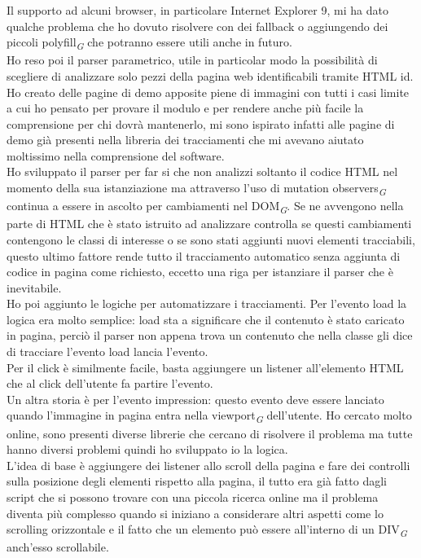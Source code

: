 \documentclass[a4paper, 12pt, twoside, openright]{book}
\newcommand{\gloss}[1]{#1\textsubscript{\textit{\tiny{G}}}}
\begin{document}
Il supporto ad alcuni browser, in particolare Internet Explorer 9, mi ha dato qualche problema che ho dovuto risolvere con dei fallback o aggiungendo dei piccoli \gloss{polyfill} che potranno essere utili anche in futuro.\\
Ho reso poi il parser parametrico, utile in particolar modo la possibilità di scegliere di analizzare solo pezzi della pagina web identificabili tramite HTML id.\\
Ho creato delle pagine di demo apposite piene di immagini con tutti i casi limite a cui ho pensato per provare il modulo e per rendere anche più facile la comprensione per chi dovrà mantenerlo, mi sono ispirato infatti alle pagine di demo già presenti nella libreria dei tracciamenti che mi avevano aiutato moltissimo nella comprensione del software.\\
Ho sviluppato il parser per far si che non analizzi soltanto il codice HTML nel momento della sua istanziazione ma attraverso l'uso di \gloss{mutation observers} continua a essere in ascolto per cambiamenti nel \gloss{DOM}. Se ne avvengono nella parte di HTML che è stato istruito ad analizzare controlla se questi cambiamenti contengono le classi di interesse o se sono stati aggiunti nuovi elementi tracciabili, questo ultimo fattore rende tutto il tracciamento automatico senza aggiunta di codice in pagina come richiesto, eccetto una riga per istanziare il parser che è inevitabile.\\
Ho poi aggiunto le logiche per automatizzare i tracciamenti. Per l'evento load la logica era molto semplice: load sta a significare che il contenuto è stato caricato in pagina, perciò il parser non appena trova un contenuto che nella classe gli dice di tracciare l'evento load lancia l'evento.\\
Per il click è similmente facile, basta aggiungere un listener all'elemento HTML che al click dell'utente fa partire l'evento.\\
Un altra storia è per l'evento impression: questo evento deve essere lanciato quando l'immagine in pagina entra nella \gloss{viewport} dell'utente. Ho cercato molto online, sono presenti diverse librerie che cercano di risolvere il problema ma tutte hanno diversi problemi quindi ho sviluppato io la logica.\\
L'idea di base è aggiungere dei listener allo scroll della pagina e fare dei controlli sulla posizione degli elementi rispetto alla pagina, il tutto era già fatto dagli script che si possono trovare con una piccola ricerca online ma il problema diventa più complesso quando si iniziano a considerare altri aspetti come lo scrolling orizzontale e il fatto che un elemento può essere all'interno di un \gloss{DIV} anch'esso scrollabile.\\
\end{document}
